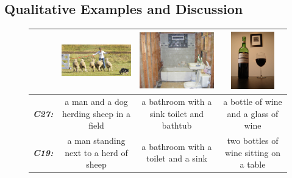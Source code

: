\subsection{Qualitative Examples and Discussion}
\begin{figure}[bth]
  \begin{center}
  \newcommand{\mcCell}[1]{%
          \multicolumn{1}{|c|}{#1}}
  \centering
  \begin{adjustbox}{center}
  \begin{tabular}{c|c|c|c|}
          \cline{2-4}
    &\includegraphics[width=0.25\linewidth,height=2.5cm]{images/COCO_val2014_000000502766.jpg} &
    \includegraphics[width=0.25\linewidth,height=2.5cm]{images/COCO_val2014_000000161720.jpg} &
    \includegraphics[width=0.25\linewidth,height=2.5cm]{images/COCO_val2014_000000385707.jpg} \\\hline
    \mcCell{\textbf{\em\scriptsize C27:}}& \parbox[c][][c]{0.25\linewidth}{\smallskip \scriptsize a man and a dog herding sheep in a field\smallskip} &
     \parbox[c][][c]{0.25\linewidth}{\smallskip \scriptsize a bathroom with a sink toilet and bathtub\smallskip} &
     \parbox[c][][c]{0.25\linewidth}{\smallskip \scriptsize a bottle of wine and a glass of wine\smallskip}\\\hline
     \mcCell{\textbf{\em\scriptsize C19:}}& \parbox[c][][c]{0.25\linewidth}{\smallskip \scriptsize a man standing next to a herd of sheep\smallskip}&
     \parbox[c][][c]{0.25\linewidth}{\smallskip \scriptsize a bathroom with a toilet and a sink\smallskip}&
     \parbox[c][][c]{0.25\linewidth}{\smallskip \scriptsize two bottles of wine sitting on a table\smallskip}\\\hline

\end{tabular}
\end{adjustbox}
\end{center}
\end{figure}
